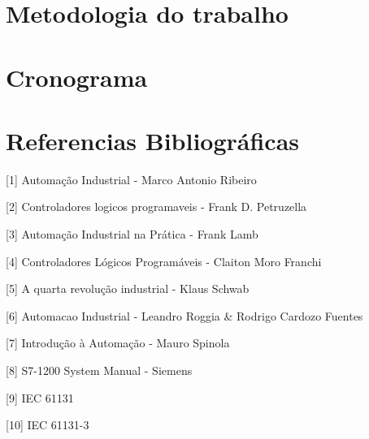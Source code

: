 \documentclass[a4paper, 12pt]{article}
\begin{document}
\section{Metodologia do trabalho}

\section{Cronograma}

\section{Referencias Bibliográficas}

[1] Automação Industrial - Marco Antonio Ribeiro

[2] Controladores logicos programaveis - Frank D. Petruzella

[3] Automação Industrial na Prática - Frank Lamb

[4] Controladores Lógicos Programáveis - Claiton Moro Franchi

[5] A quarta revolução industrial - Klaus Schwab

[6] Automacao Industrial - Leandro Roggia \& Rodrigo Cardozo Fuentes

[7] Introdução à Automação - Mauro Spinola

[8] S7-1200 System Manual - Siemens

[9] IEC 61131

[10] IEC 61131-3
\end{document}
